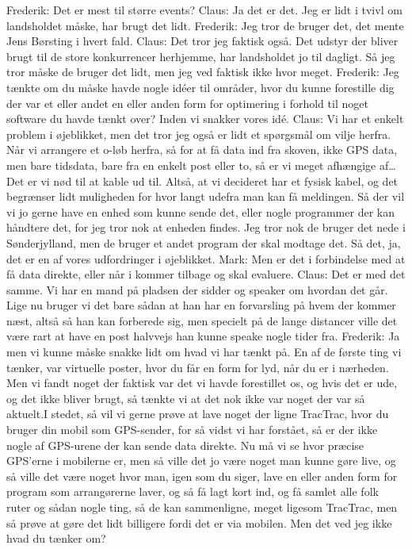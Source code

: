 Frederik: Det er mest til større events?\newline
Claus: Ja det er det. Jeg er lidt i tvivl om landsholdet måske, har brugt det lidt.\newline
Frederik: Jeg tror de bruger det, det mente Jens Børsting i hvert fald.\newline
Claus: Det tror jeg faktisk også. Det udstyr der bliver brugt til de store konkurrencer herhjemme, har landsholdet jo til dagligt. Så jeg tror måske de bruger det lidt, men jeg ved faktisk ikke hvor meget.\newline 
Frederik: Jeg tænkte om du måske havde nogle idéer til områder, hvor du kunne forestille dig der var et eller andet en eller anden form for optimering i forhold til noget software du havde tænkt over? Inden vi snakker vores idé. \newline
Claus: Vi har et enkelt problem i øjeblikket, men det tror jeg også er lidt et spørgsmål om vilje herfra. Når vi arrangere et o-løb herfra, så for at få data ind fra skoven, ikke GPS data, men bare tidsdata, bare fra en enkelt post eller to, så er vi meget afhængige af… Det er vi nød til at kable ud til. Altså, at vi decideret har et fysisk kabel, og det begrænser lidt muligheden for hvor langt udefra man kan få meldingen. Så der vil vi jo gerne have en enhed som kunne sende det, eller nogle programmer der kan håndtere det, for jeg tror nok at enheden findes. Jeg tror nok de bruger det nede i Sønderjylland, men de bruger et andet program der skal modtage det. Så det, ja, det er en af vores udfordringer i øjeblikket. \newline
Mark: Men er det i forbindelse med at få data direkte, eller når i kommer tilbage og skal evaluere.\newline
Claus: Det er med det samme. Vi har en mand på pladsen der sidder og speaker om hvordan det går. Lige nu bruger vi det bare sådan at han har en forvarsling på hvem der kommer næst, altså så han kan forberede sig, men specielt på de lange distancer ville det være rart at have en post halvvejs han kunne speake nogle tider fra.\newline
Frederik: Ja men vi kunne måske snakke lidt om hvad vi har tænkt på. 
En af de første ting vi tænker, var virtuelle poster, hvor du får en form for lyd, når du er i nærheden. Men vi fandt noget der faktisk var det vi havde forestillet os, og hvis det er ude, og det ikke bliver brugt, så tænkte vi at det nok ikke var noget der var så aktuelt.I stedet, så vil vi gerne prøve at lave noget der ligne TracTrac, hvor du bruger din mobil som GPS-sender, for så vidst vi har forstået, så er der ikke nogle af GPS-urene der kan sende data direkte. Nu må vi se hvor præcise GPS’erne i mobilerne er, men så ville det jo være noget man kunne gøre live, og så ville det være noget hvor man, igen som du siger, lave en eller anden form for program som arrangørerne laver, og så få lagt kort ind, og få samlet alle folk ruter og sådan nogle ting, så de kan sammenligne, meget ligesom TracTrac, men så prøve at gøre det lidt billigere fordi det er via mobilen. Men det ved jeg ikke hvad du tænker om?\newline

